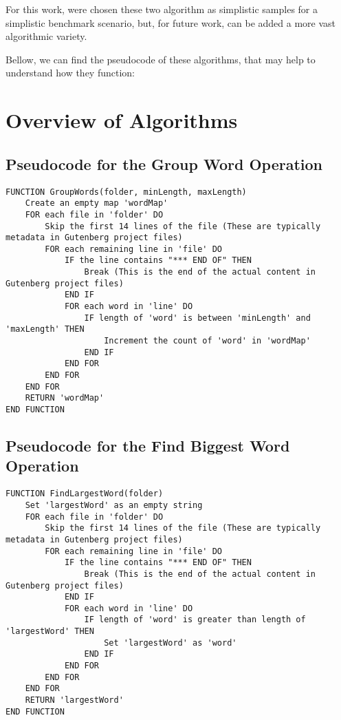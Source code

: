 For this work, were chosen these two algorithm as simplistic samples for a simplistic benchmark scenario, but, for future work, can be added a more vast algorithmic variety.

Bellow, we can find the pseudocode of these algorithms, that may help to understand how they function:


\section{Overview of Algorithms}
\label{sec:algorithm_overview}


\subsection*{Pseudocode for the Group Word Operation}
\begin{lstlisting}[language={}, caption={Pseudocode for GroupWords function}, label={lst:groupwords}]
FUNCTION GroupWords(folder, minLength, maxLength)
    Create an empty map 'wordMap'
    FOR each file in 'folder' DO
        Skip the first 14 lines of the file (These are typically metadata in Gutenberg project files)
        FOR each remaining line in 'file' DO
            IF the line contains "*** END OF" THEN
                Break (This is the end of the actual content in Gutenberg project files)
            END IF
            FOR each word in 'line' DO
                IF length of 'word' is between 'minLength' and 'maxLength' THEN
                    Increment the count of 'word' in 'wordMap'
                END IF
            END FOR
        END FOR
    END FOR
    RETURN 'wordMap'
END FUNCTION
\end{lstlisting}

\clearpage

\subsection*{Pseudocode for the Find Biggest Word Operation}
\begin{lstlisting}[language={}, caption={Pseudocode for FindLargestWord function}, label={lst:findlargestword}]
FUNCTION FindLargestWord(folder)
    Set 'largestWord' as an empty string
    FOR each file in 'folder' DO
        Skip the first 14 lines of the file (These are typically metadata in Gutenberg project files)
        FOR each remaining line in 'file' DO
            IF the line contains "*** END OF" THEN
                Break (This is the end of the actual content in Gutenberg project files)
            END IF
            FOR each word in 'line' DO
                IF length of 'word' is greater than length of 'largestWord' THEN
                    Set 'largestWord' as 'word'
                END IF
            END FOR
        END FOR
    END FOR
    RETURN 'largestWord'
END FUNCTION
\end{lstlisting}

